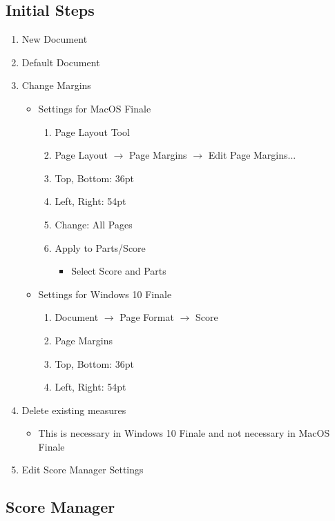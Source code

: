 \documentclass[unicode,hyperfootnotes=false,xetex,colorlinks=true,nofonts,nobib]{tufte-book} %
\begin{document}
\subsection{Initial Steps}
\label{sec:initial-steps}


\begin{enumerate}
\item New Document
\item Default Document
\item Change Margins
  \begin{itemize}
  \item Settings for MacOS Finale
    \begin{enumerate}
    \item Page Layout Tool
    \item Page Layout $\rightarrow$ Page Margins $\rightarrow$ Edit
      Page Margins...
    \item Top, Bottom: 36pt
    \item Left, Right: 54pt
    \item Change: All Pages
    \item Apply to Parts/Score
      \begin{itemize}
      \item Select Score and Parts
      \end{itemize}
    \end{enumerate}
  \end{itemize}
  \begin{itemize}
  \item Settings for Windows 10 Finale
    \begin{enumerate}
    \item Document $\rightarrow$ Page Format $\rightarrow$ Score
    \item Page Margins
    \item Top, Bottom: 36pt
    \item Left, Right: 54pt
    \end{enumerate}
  \end{itemize}
\item Delete existing measures
  \begin{itemize}
  \item This is necessary in Windows 10 Finale and not necessary in
    MacOS Finale
  \end{itemize}
\item Edit Score Manager Settings
\end{enumerate}

\subsection{Score Manager}
\label{sec:score-manager}
\end{document}
